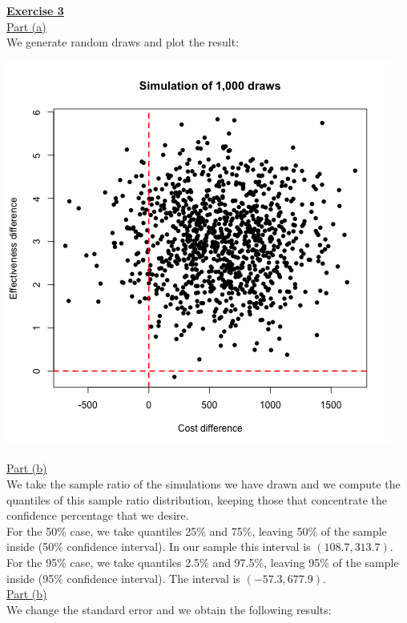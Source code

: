 \documentclass[a4paper, 11pt]{article}
\begin{document}
\newpage
\textbf{\underline{Exercise 3}}\\
\newline \underline{Part (a)}\\
\newline We generate random draws and plot the result:
\begin{center}
\includegraphics[scale=0.6]{plot_ex3dot1.png}
\end{center}
\underline{Part (b)}\\
\newline We take the sample ratio of the simulations we have drawn and we compute the quantiles of this sample ratio distribution, keeping those that concentrate the confidence percentage that we desire.\\
\newline For the 50\% case, we take quantiles 25\% and 75\%, leaving 50\% of the sample inside (50\% confidence interval). In our sample this interval is $(108.7, 313.7)$.\\
\newline For the 95\% case, we take quantiles 2.5\% and 97.5\%, leaving 95\% of the sample inside (95\% confidence interval). The interval is $(-57.3, 677.9)$.\\
\newline \underline{Part (b)}\\
\newline We change the standard error and we obtain the following results:
\end{document}
